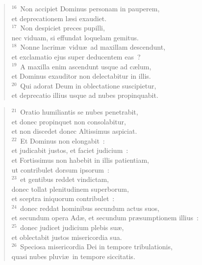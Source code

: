 \begin{flushleft}
\begin{verse}
${}^{16}$~Non accipiet Dominus personam in pauperem,\\ et deprecationem l\ae si exaudiet.\\
${}^{17}$~Non despiciet preces pupilli,\\ nec viduam, si effundat loquelam gemitus.\\
${}^{18}$~Nonne lacrim\ae\ vidu\ae\ ad maxillam descendunt,\\ et exclamatio ejus super deducentem eas~?\\
${}^{19}$~A maxilla enim ascendunt usque ad c\ae lum,\\ et Dominus exauditor non delectabitur in illis.\\
${}^{20}$~Qui adorat Deum in oblectatione suscipietur,\\ et deprecatio illius usque ad nubes propinquabit.\end{verse}\end{flushleft}


\begin{flushleft}\begin{verse}${}^{21}$~Oratio humiliantis se nubes penetrabit,\\ et donec propinquet non consolabitur,\\ et non discedet donec Altissimus aspiciat.\\
${}^{22}$~Et Dominus non elongabit~:\\ et judicabit justos, et faciet judicium~:\\ et Fortissimus non habebit in illis patientiam,\\ ut contribulet dorsum ipsorum~:\\
${}^{23}$~et gentibus reddet vindictam,\\ donec tollat plenitudinem superborum,\\ et sceptra iniquorum contribulet~:\\
${}^{24}$~donec reddat hominibus secundum actus suos,\\ et secundum opera Ad\ae , et secundum pr\ae sumptionem illius~:\\
${}^{25}$~donec judicet judicium plebis su\ae ,\\ et oblectabit justos misericordia sua.\\
${}^{26}$~Speciosa misericordia Dei in tempore tribulationis,\\ quasi nubes pluvi\ae\ in tempore siccitatis.\end{verse}\end{flushleft}


